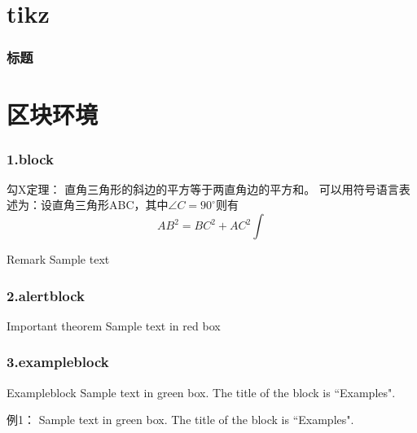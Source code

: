 
\section{tikz}


\begin{frame}
	\frametitle{标题}	
	
\end{frame}


\section{区块环境}

\begin{frame}
\frametitle{1.block}
	\begin{block}{勾X定理：}
		直角三角形的斜边的平方等于两直角边的平方和。
		可以用符号语言表述为：设直角三角形ABC，其中$\angle C=90^\circ $则有
		\begin{equation}
			AB^2=BC^2+AC^2 \int
		\end{equation}
	\end{block}
	\begin{block}{Remark}
		Sample text
	\end{block}
\end{frame}

\begin{frame}
    \frametitle{2.alertblock}
	\begin{alertblock}{Important theorem}
		Sample text in red box
	\end{alertblock}
\end{frame}

\begin{frame}
    \frametitle{3.exampleblock}
	\begin{exampleblock} {Exampleblock}
		Sample text in green box. The title of the block is ``Examples".
	\end{exampleblock}
    \begin{exampleblock} {例1：}
		Sample text in green box. The title of the block is ``Examples".
	\end{exampleblock}
\end{frame}

